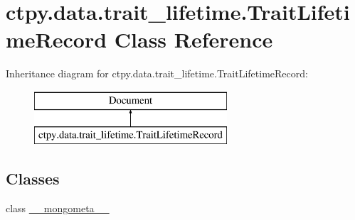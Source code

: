 \hypertarget{classctpy_1_1data_1_1trait__lifetime_1_1_trait_lifetime_record}{\section{ctpy.\-data.\-trait\-\_\-lifetime.\-Trait\-Lifetime\-Record Class Reference}
\label{classctpy_1_1data_1_1trait__lifetime_1_1_trait_lifetime_record}
}
Inheritance diagram for ctpy.\-data.\-trait\-\_\-lifetime.\-Trait\-Lifetime\-Record\-:\begin{figure}[H]
\begin{center}
\leavevmode
\includegraphics[height=2.000000cm]{classctpy_1_1data_1_1trait__lifetime_1_1_trait_lifetime_record}
\end{center}
\end{figure}
\subsection*{Classes}
\begin{DoxyCompactItemize}
\item 
class \hyperlink{classctpy_1_1data_1_1trait__lifetime_1_1_trait_lifetime_record_1_1____mongometa____}{\-\_\-\-\_\-mongometa\-\_\-\-\_\-}
\end{DoxyCompactItemize}
